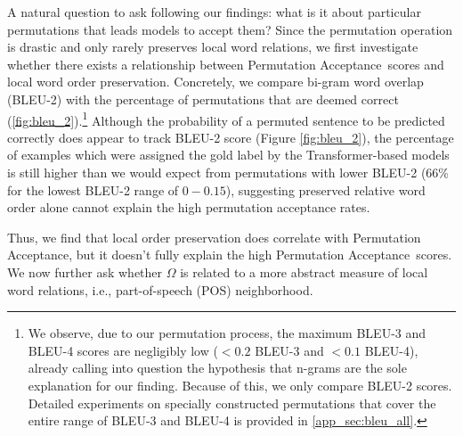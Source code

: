 \documentclass[letterpaper, 12pt]{report}
\newcommand{\PermAcc}{Permutation Acceptance} %
\begin{document}
A natural question to ask following our findings: what is it about particular permutations that leads models to accept them? Since the permutation operation is drastic and only rarely preserves local word relations, we first investigate whether there exists a relationship between \PermAcc\ scores and local word order preservation. Concretely, we compare bi-gram word overlap (BLEU-2) with the percentage of permutations that are deemed correct (\autoref{fig:bleu_2}).\footnote{We observe, due to our permutation process, the maximum BLEU-3 and BLEU-4 scores are negligibly low ($< 0.2$  BLEU-3 and $< 0.1$ BLEU-4), already calling into question the hypothesis that n-grams are the sole explanation for our finding. Because of this, we only compare BLEU-2 scores. Detailed experiments on specially constructed permutations that cover the entire range of BLEU-3 and BLEU-4 is provided in \autoref{app_sec:bleu_all}.} Although the probability of a permuted sentence to be predicted correctly does appear to track BLEU-2 score (Figure \ref{fig:bleu_2}), the percentage of examples which were assigned the gold label by the Transformer-based models is still higher than we would expect from permutations with lower BLEU-2 (66\% for the lowest BLEU-2 range of $0-0.15$), suggesting preserved relative word order alone cannot explain the high permutation acceptance rates.

Thus, we find that local order preservation does correlate with \PermAcc, but it doesn't fully explain the high \PermAcc\ scores.
We now further ask whether $\Omega$ is related to a more abstract measure of local word relations, i.e., part-of-speech (POS) neighborhood.

\end{document}
